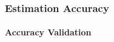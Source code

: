 \documentclass[12pt, titlepage]{article}
\begin{document}





\subsubsection{Estimation Accuracy}
		
\paragraph{Accuracy Validation}
\end{document}
